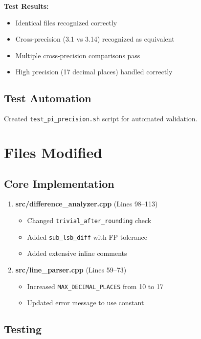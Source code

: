 \documentclass[11pt]{article}
\begin{document}
\textbf{Test Results:}

\begin{itemize}
    \item Identical files recognized correctly
    \item Cross-precision (3.1 vs 3.14) recognized as equivalent
    \item Multiple cross-precision comparisons pass
    \item High precision (17 decimal places) handled correctly
\end{itemize}

\subsection{Test Automation}

Created \texttt{test\_pi\_precision.sh} script for automated validation.

\section{Files Modified}

\subsection{Core Implementation}

\begin{enumerate}
    \item \textbf{src/difference\_analyzer.cpp} (Lines 98--113)
    \begin{itemize}
        \item Changed \texttt{trivial\_after\_rounding} check
        \item Added \texttt{sub\_lsb\_diff} with FP tolerance
        \item Added extensive inline comments
    \end{itemize}

    \item \textbf{src/line\_parser.cpp} (Lines 59--73)
    \begin{itemize}
        \item Increased \texttt{MAX\_DECIMAL\_PLACES} from 10 to 17
        \item Updated error message to use constant
    \end{itemize}
\end{enumerate}

\subsection{Testing}
\end{document}
